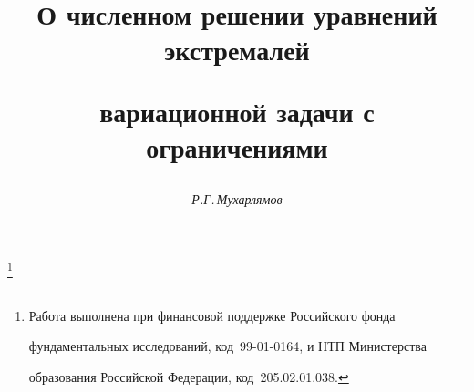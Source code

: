 

 




 




\newcommand{\tts}[1]{} 


 




\setcounter{page}{36} 












 


\author{\it Р.Г.\,Мухарлямов} 




\title{О численном решении уравнений экстремалей 


вариационной задачи с ограничениями} 


\thanks{Работа выполнена при финансовой поддержке Российского фонда 


фундаментальных исследований, код \No\,99-01-0164, и НТП Министерства


образования Российской Федерации, код \No\,205.02.01.038.} 


 


\date{} 




\pagestyle{plain} %


 





